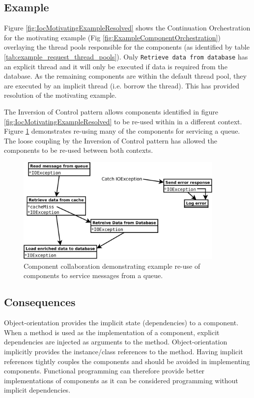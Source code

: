 \documentclass[prodmode]{style/acmlarge}
\begin{document}
\subsection{Example}

Figure \ref{fig:IocMotivatingExampleResolved} shows the Continuation
Orchestration for the motivating example (Fig
\ref{fig:ExampleComponentOrchestration}) overlaying the thread pools responsible
for the components (as identified by table
\ref{tab:example_request_thread_pools}).  Only \texttt{Retrieve data from
database} has an explicit thread and it will only be executed if data is
required from the database.  As the remaining components are within the default
thread pool, they are executed by an implicit thread (i.e. borrow the thread). 
This has provided resolution of the motivating example.

The Inversion of Control pattern allows components identified in figure
\ref{fig:IocMotivatingExampleResolved} to be re-used within in a different
context. Figure \ref{fig:IocReuseForQueue} demonstrates re-using many of the
components for servicing a queue.  The loose coupling by the Inversion of
Control pattern has allowed the components to be re-used between both contexts.


\begin{figure}[t]
\centering
\includegraphics[width=4in]{IocReuseForQueue}
\caption{Component collaboration demonstrating example re-use of components to service messages from a queue.}
\label{fig:IocReuseForQueue}
\end{figure}


\subsection{Consequences}

Object-orientation provides the implicit state (dependencies) to a component.
When a method is used as the implementation of a component, explicit
dependencies are injected as arguments to the method.  Object-orientation
implicitly provides the instance/class references to the method.  Having
implicit references tightly couples the components and should be avoided in
implementing components.  Functional programming can therefore provide better
implementations of components as it can be considered programming without
implicit dependencies.
\end{document}
